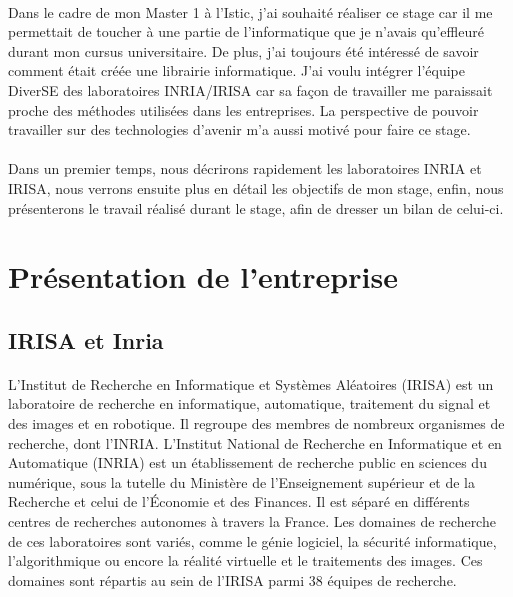 \documentclass[11pt, a4paper, pdftex]{article}
\begin{document}
        \paragraph{}
            Dans le cadre de mon Master 1 à l'Istic, j'ai souhaité réaliser ce stage car il me permettait de toucher à une partie de l'informatique que je n'avais
            qu'effleuré durant mon cursus universitaire.
            De plus, j'ai toujours été intéressé de savoir comment était créée une librairie informatique.
            J'ai voulu intégrer l'équipe DiverSE des laboratoires INRIA/IRISA car sa façon de travailler me paraissait proche des méthodes utilisées dans les entreprises.
            La perspective de pouvoir travailler sur des technologies d'avenir m'a aussi motivé pour faire ce stage.

        \paragraph{}
            Dans un premier temps, nous décrirons rapidement les laboratoires INRIA et IRISA, nous verrons ensuite plus en détail les objectifs de mon stage,
            enfin, nous présenterons le travail réalisé durant le stage, afin de dresser un bilan de celui-ci.
    \newpage
    \section{Présentation de l'entreprise}\label{sec:presentr}
    \vspace{1cm}
    \subsection{IRISA et Inria}\label{subsec:irisa}
        \paragraph{}
            L'Institut de Recherche en Informatique et Systèmes Aléatoires (IRISA) est un laboratoire de recherche en informatique, automatique,
            traitement du signal et des images et en robotique. Il regroupe des membres de nombreux organismes de recherche, dont l'INRIA\@.
            L'Institut National de Recherche en Informatique et en Automatique (INRIA) est un établissement de recherche public en sciences du numérique,
            sous la tutelle du Ministère de l'Enseignement supérieur et de la Recherche et celui de l'Économie et des Finances.
            Il est séparé en différents centres de recherches autonomes à travers la France.
            Les domaines de recherche de ces laboratoires sont variés, comme le génie logiciel, la sécurité informatique, l'algorithmique ou encore la réalité virtuelle et le traitements des images.
            Ces domaines sont répartis au sein de l'IRISA parmi 38 équipes de recherche.
    \vspace{1cm}
\end{document}
